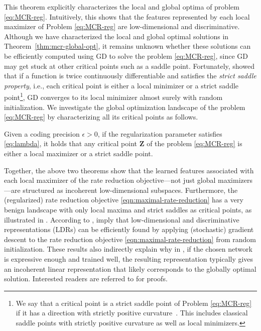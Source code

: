 \documentclass[../../book-main.tex]{subfiles}
\begin{document}
This theorem explicitly characterizes the local and global optima of problem \eqref{eq:MCR-reg}. Intuitively, this shows that the features represented by each local maximizer of Problem \eqref{eq:MCR-reg} are low-dimensional and discriminative. Although we have characterized the local and global optimal solutions in Theorem~\ref{thm:mcr-global-opt}, it remains unknown whether these solutions can be efficiently computed using GD to solve the problem \eqref{eq:MCR-reg}, since GD may get stuck at other critical points such as a saddle point.
Fortunately, \cite{sun2015nonconvex,lee2016gradient} showed that if a function is twice continuously differentiable and satisfies the {\em strict saddle property}, i.e., each critical point is either a local minimizer or a strict saddle point\footnote{We say that a critical point is a strict saddle point of Problem \eqref{eq:MCR-reg} if it has a direction with strictly positive curvature~\cite{sun2015nonconvex}. This includes classical saddle points with strictly positive curvature as well as local minimizers.}, GD converges to its local minimizer almost surely with random initialization. We investigate the global optimization landscape of the problem \eqref{eq:MCR-reg} by characterizing all its critical points as follows.

 \begin{theorem}\label{thm:mcr-benign-opt-landscape}
	Given a coding precision $\epsilon > 0$, if the regularization parameter satisfies \eqref{eq:lambda},
	it holds that any critical point $\bm Z$ of the problem \eqref{eq:MCR-reg} is either a local maximizer or a strict saddle point.
\end{theorem}
Together, the above two theorems
show that the learned features associated with each local maximizer of the rate
reduction objective---not just global maximizers---are structured as incoherent low-dimensional subspaces. Furthermore, the (regularized) rate reduction objective \eqref{eqn:maximal-rate-reduction} has a very benign landscape with only local maxima and strict saddles as critical points, as illustrated in . 
According to \cite{sun2015nonconvex,lee2016gradient},  imply that low-dimensional and discriminative representations (LDRs) can be efficiently found by applying (stochastic) gradient descent to the rate reduction objective \eqref{eqn:maximal-rate-reduction} from random initialization. These results also indirectly explain why in , if the chosen network is expressive enough and trained well, the resulting representation typically gives an incoherent linear representation that likely corresponds to the globally optimal solution.
Interested readers are referred to \cite{wang2024global} for proofs. 
\end{document}
